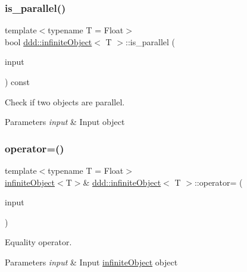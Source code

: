 \subsubsection{\texorpdfstring{is\+\_\+parallel()}{is\_parallel()}}
{\footnotesize\ttfamily template$<$typename T = Float$>$ \\
bool \hyperlink{classddd_1_1infinite_object}{ddd\+::infinite\+Object}$<$ T $>$\+::is\+\_\+parallel (\begin{DoxyParamCaption}\item[{const \hyperlink{classddd_1_1infinite_object}{infinite\+Object}$<$ T $>$ \&}]{input }\end{DoxyParamCaption}) const\hspace{0.3cm}{\ttfamily [inline]}}



Check if two objects are parallel. 


\begin{DoxyParams}{Parameters}
{\em input} & Input object \\
\hline
\end{DoxyParams}
\mbox{\label{classddd_1_1infinite_object_a9ef05346c0b6794cd05d3e5d132ad6db}} 
\subsubsection{\texorpdfstring{operator=()}{operator=()}}
{\footnotesize\ttfamily template$<$typename T = Float$>$ \\
\hyperlink{classddd_1_1infinite_object}{infinite\+Object}$<$T$>$\& \hyperlink{classddd_1_1infinite_object}{ddd\+::infinite\+Object}$<$ T $>$\+::operator= (\begin{DoxyParamCaption}\item[{const \hyperlink{classddd_1_1infinite_object}{infinite\+Object}$<$ T $>$ \&}]{input }\end{DoxyParamCaption})\hspace{0.3cm}{\ttfamily [inline]}}



Equality operator. 


\begin{DoxyParams}{Parameters}
{\em input} & Input \hyperlink{classddd_1_1infinite_object}{infinite\+Object} object \\
\hline
\end{DoxyParams}
\mbox{\label{classddd_1_1infinite_object_a7cd3342d60d4de4e4fc91d90fa9cc065}} 
